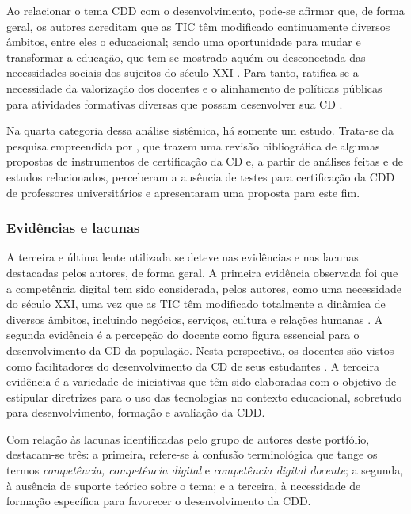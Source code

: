 \documentclass[portuguese]{textolivre}
\begin{document}
Ao relacionar o tema CDD com o desenvolvimento, pode-se afirmar que, de forma geral, os autores acreditam que as TIC têm modificado continuamente diversos âmbitos, entre eles o educacional; sendo uma oportunidade para mudar e transformar a educação, que tem se mostrado aquém ou desconectada das necessidades sociais dos sujeitos do século XXI \cite{coscollola_fomentando_2020,flores_practica_2020,hepp_teacher_2015,rosenblit_e-teaching_2018}. Para tanto, ratifica-se a necessidade da valorização dos docentes e o alinhamento de políticas públicas para atividades formativas diversas que possam desenvolver sua CD \cite{falloon_digital_2020,pettersson_issues_2018}.

Na quarta categoria dessa análise sistêmica, há somente um estudo. Trata-se da pesquisa empreendida por \textcite{cuartero_certificacion_2019}, que trazem uma revisão bibliográfica de algumas propostas de instrumentos de certificação da CD e, a partir de análises feitas e de estudos relacionados, perceberam a ausência de testes para certificação da CDD de professores universitários e apresentaram uma proposta para este fim.

\subsubsection{Evidências e lacunas}

A terceira e última lente utilizada se deteve nas evidências e nas lacunas destacadas pelos autores, de forma geral. A primeira evidência observada foi que a competência digital tem sido considerada, pelos autores, como uma necessidade do século XXI, uma vez que as TIC têm modificado totalmente a dinâmica de diversos âmbitos, incluindo negócios, serviços, cultura e relações humanas \cite{villa_competencias_2019}. A segunda evidência é a percepção do docente como figura essencial para o desenvolvimento da CD da população. Nesta perspectiva, os docentes são vistos como facilitadores do desenvolvimento da CD de seus estudantes \cite{trindade_escala_2019}. A terceira evidência é a variedade de iniciativas que têm sido elaboradas com o objetivo de estipular diretrizes para o uso das tecnologias no contexto educacional, sobretudo para desenvolvimento, formação e avaliação da CDD.

Com relação às lacunas identificadas pelo grupo de autores deste portfólio, destacam-se três: a primeira, refere-se à confusão terminológica que tange os termos \textit{competência, competência digital} e \textit{competência digital docente}; a segunda, à ausência de suporte teórico sobre o tema; e a terceira, à necessidade de formação específica para favorecer o desenvolvimento da CDD.
\end{document}
